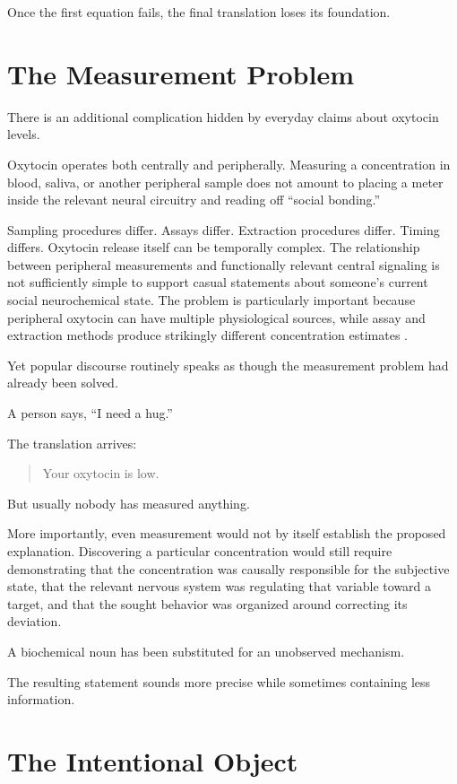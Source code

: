 \documentclass[12pt]{article}
\begin{document}
Once the first equation fails, the final translation loses its foundation.

\section{The Measurement Problem}

There is an additional complication hidden by everyday claims about oxytocin levels.

Oxytocin operates both centrally and peripherally. Measuring a concentration in blood, saliva, or another peripheral sample does not amount to placing a meter inside the relevant neural circuitry and reading off ``social bonding.''

Sampling procedures differ. Assays differ. Extraction procedures differ. Timing differs. Oxytocin release itself can be temporally complex. The relationship between peripheral measurements and functionally relevant central signaling is not sufficiently simple to support casual statements about someone's current social neurochemical state. The problem is particularly important because peripheral oxytocin can have multiple physiological sources, while assay and extraction methods produce strikingly different concentration estimates \cite{burenkova2023endogenous}.

Yet popular discourse routinely speaks as though the measurement problem had already been solved.

A person says, ``I need a hug.''

The translation arrives:

\begin{quote}
Your oxytocin is low.
\end{quote}

But usually nobody has measured anything.

More importantly, even measurement would not by itself establish the proposed explanation. Discovering a particular concentration would still require demonstrating that the concentration was causally responsible for the subjective state, that the relevant nervous system was regulating that variable toward a target, and that the sought behavior was organized around correcting its deviation.

A biochemical noun has been substituted for an unobserved mechanism.

The resulting statement sounds more precise while sometimes containing less information.

\section{The Intentional Object}
\end{document}
